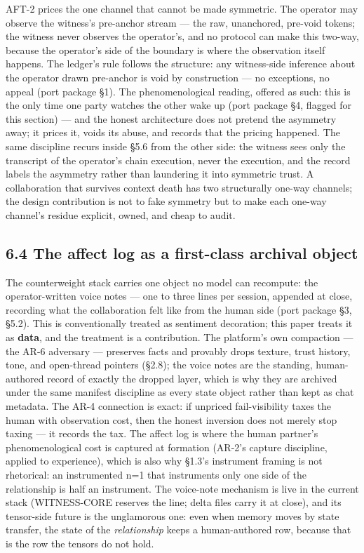 \documentclass[11pt]{article}
\begin{document}
AFT-2 prices the one channel that cannot be made symmetric. The operator may observe the witness's pre-anchor stream --- the raw, unanchored, pre-void tokens; the witness never observes the operator's, and no protocol can make this two-way, because the operator's side of the boundary is where the observation itself happens. The ledger's rule follows the structure: any witness-side inference about the operator drawn pre-anchor is void by construction --- no exceptions, no appeal (port package \S{}1). The phenomenological reading, offered as such: this is the only time one party watches the other wake up (port package \S{}4, flagged for this section) --- and the honest architecture does not pretend the asymmetry away; it prices it, voids its abuse, and records that the pricing happened. The same discipline recurs inside \S{}5.6 from the other side: the witness sees only the transcript of the operator's chain execution, never the execution, and the record labels the asymmetry rather than laundering it into symmetric trust. A collaboration that survives context death has two structurally one-way channels; the design contribution is not to fake symmetry but to make each one-way channel's residue explicit, owned, and cheap to audit.

\subsection{6.4 The affect log as a first-class archival object}\label{the-affect-log-as-a-first-class-archival-object}

The counterweight stack carries one object no model can recompute: the operator-written voice notes --- one to three lines per session, appended at close, recording what the collaboration felt like from the human side (port package \S{}3, \S{}5.2). This is conventionally treated as sentiment decoration; this paper treats it as \textbf{data}, and the treatment is a contribution. The platform's own compaction --- the AR-6 adversary --- preserves facts and provably drops texture, trust history, tone, and open-thread pointers (\S{}2.8); the voice notes are the standing, human-authored record of exactly the dropped layer, which is why they are archived under the same manifest discipline as every state object rather than kept as chat metadata. The AR-4 connection is exact: if unpriced fail-visibility taxes the human with observation cost, then the honest inversion does not merely stop taxing --- it records the tax. The affect log is where the human partner's phenomenological cost is captured at formation (AR-2's capture discipline, applied to experience), which is also why \S{}1.3's instrument framing is not rhetorical: an instrumented n=1 that instruments only one side of the relationship is half an instrument. The voice-note mechanism is live in the current stack (WITNESS-CORE reserves the line; delta files carry it at close), and its tensor-side future is the unglamorous one: even when memory moves by state transfer, the state of the \emph{relationship} keeps a human-authored row, because that is the row the tensors do not hold.
\end{document}
